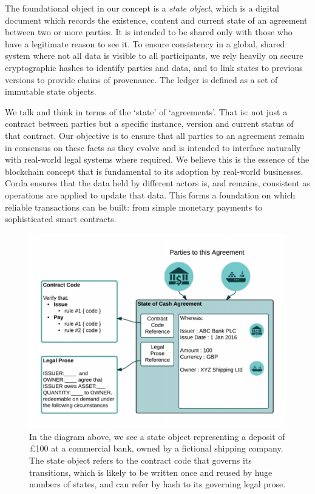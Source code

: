 \documentclass{article}
\begin{document}
The foundational object in our concept is a \textit{state object}, which is a digital document which records the existence, content and current state of an agreement between two or more parties. It is intended to be shared only with those who have a legitimate reason to see it. To ensure consistency in a global, shared system where not all data is visible to all participants, we rely heavily on secure cryptographic hashes to identify parties and data, and to link states to previous versions to provide chains of provenance. The ledger is defined as a set of immutable state objects.

We talk and think in terms of the `state' of `agreements'. That is: not just a contract between parties but a specific instance, version and current status of that contract. Our objective is to ensure that all parties to an agreement remain in consensus on these facts as they evolve and is intended to interface naturally with real-world legal systems where required. We believe this is the essence of the blockchain concept that is fundamental to its adoption by real-world businesses. Corda ensures that the data held by different actors is, and remains, consistent as operations are applied to update that data. This forms a foundation on which reliable transactions can be built: from simple monetary payments to sophisticated smart contracts.

\begin{figure}[H]
\includegraphics[scale = .4, center]{partiesto}
\caption{In the diagram above, we see a state object representing a deposit of \pounds100 at a commercial bank, owned by a fictional shipping company. The state object refers to the contract code that governs its transitions, which is likely to be written once and reused by huge numbers of states, and can refer by hash to its governing legal prose.}
\end{figure}
\end{document}
